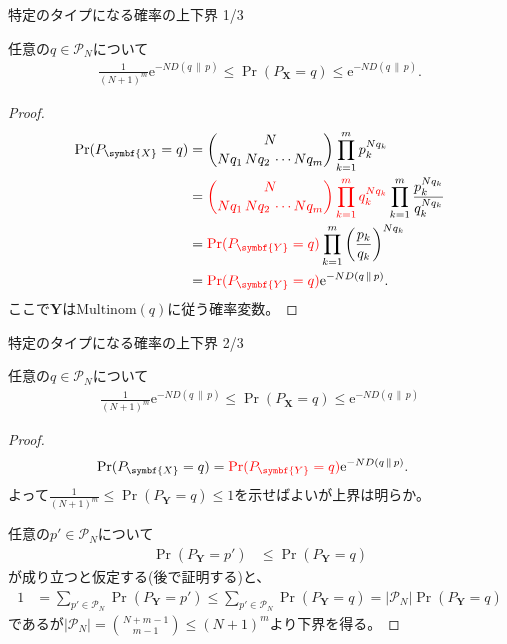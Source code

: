 \documentclass[lualatex,handout]{beamer}
\newcommand{\mycolor}[2]{%
  \begingroup
  \colorlet{currentcolor}{.}%
  \color{#1}#2%
  \color{currentcolor}%
  \endgroup
}
\newcommand{\emm}[1]{\mycolor{red}{#1}}
\newcommand\KL[2]{D(#1\,\|\,#2)}
\theoremstyle{definition}
\begin{document}
\begin{frame}{特定のタイプになる確率の上下界 1/3}
\small
\begin{lemma}
任意の$q\in\mathcal{P}_N$について
\begin{align*}
\frac1{(N+1)^m}\mathrm{e}^{-N \KL{q}{p}}\le
\Pr(P_{\symbf{X}} = q)
\le \mathrm{e}^{-N \KL{q}{p}}.
\end{align*}
\end{lemma}
\begin{proof}
\vspace{-2em}
\begin{align*}
\Pr(P_{\symbf{X}}= q) &= \binom{N}{Nq_1\,Nq_2\,\dotsm Nq_m} \prod_{k=1}^m p_k^{Nq_k}\\
 &= \emm{\binom{N}{Nq_1\,Nq_2\,\dotsm Nq_m} \prod_{k=1}^m q_k^{Nq_k}}\prod_{k=1}^m\frac{p_k^{Nq_k}}{q_k^{Nq_k}}\\
 &= \emm{\Pr(P_{\symbf{Y}}= q)}\prod_{k=1}^m\left(\frac{p_k}{q_k}\right)^{Nq_k}\\
 &=\emm{\Pr(P_{\symbf{Y}}= q)}\mathrm{e}^{-N \KL{q}{p}}.
\end{align*}
ここで$\symbf{Y}$は$\mathrm{Multinom}(q)$に従う確率変数。
\end{proof}
\end{frame}

\begin{frame}{特定のタイプになる確率の上下界 2/3}
\footnotesize
\begin{lemma}
任意の$q\in\mathcal{P}_N$について
\begin{align*}
\frac1{(N+1)^m}\mathrm{e}^{-N \KL{q}{p}}\le
\Pr(P_{\symbf{X}} = q)
\le \mathrm{e}^{-N \KL{q}{p}}
\end{align*}
\end{lemma}
\begin{proof}
\vspace{-2em}
\begin{align*}
\Pr(P_{\symbf{X}}= q) &= \emm{\Pr(P_{\symbf{Y}}= q)}\mathrm{e}^{-N \KL{q}{p}}.
\end{align*}
よって$\frac1{(N+1)^m}\le\Pr(P_{\symbf{Y}}= q)\le 1$を示せばよいが上界は明らか。

%
任意の$p'\in\mathcal{P}_N$について
\begin{align*}
\Pr\left(P_{\symbf{Y}}= p'\right)&\le
\Pr\left(P_{\symbf{Y}}= q\right)
\end{align*}
が成り立つと仮定する(後で証明する)と、
\begin{align*}
1&=\sum_{p'\in\mathcal{P}_N} \Pr\left(P_{\symbf{Y}}= p'\right)
\le\sum_{p'\in\mathcal{P}_N} \Pr\left(P_{\symbf{Y}}= q\right)
=|\mathcal{P}_N| \Pr\left(P_{\symbf{Y}}= q\right)
\end{align*}
であるが$|\mathcal{P}_N|=\binom{N+m-1}{m-1}\le (N+1)^m$より下界を得る。
\end{proof}
\end{frame}
\end{document}
